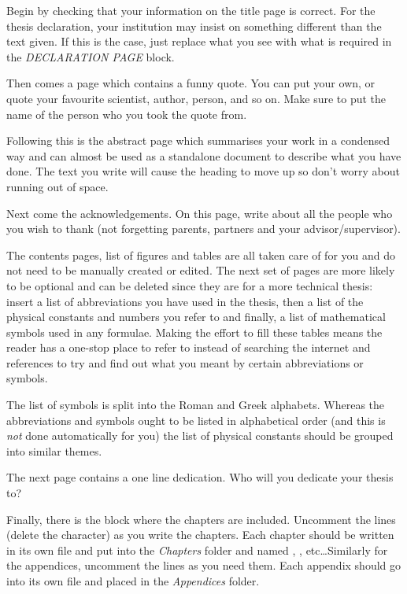 Begin by checking that your information on the title page is correct. For the thesis declaration, your institution may insist on something different than the text given. If this is the case, just replace what you see with what is required in the \emph{DECLARATION PAGE} block.

Then comes a page which contains a funny quote. You can put your own, or quote your favourite scientist, author, person, and so on. Make sure to put the name of the person who you took the quote from.

Following this is the abstract page which summarises your work in a condensed way and can almost be used as a standalone document to describe what you have done. The text you write will cause the heading to move up so don't worry about running out of space.

Next come the acknowledgements. On this page, write about all the people who you wish to thank (not forgetting parents, partners and your advisor/supervisor).

The contents pages, list of figures and tables are all taken care of for you and do not need to be manually created or edited. The next set of pages are more likely to be optional and can be deleted since they are for a more technical thesis: insert a list of abbreviations you have used in the thesis, then a list of the physical constants and numbers you refer to and finally, a list of mathematical symbols used in any formulae. Making the effort to fill these tables means the reader has a one-stop place to refer to instead of searching the internet and references to try and find out what you meant by certain abbreviations or symbols.

The list of symbols is split into the Roman and Greek alphabets. Whereas the abbreviations and symbols ought to be listed in alphabetical order (and this is \emph{not} done automatically for you) the list of physical constants should be grouped into similar themes.

The next page contains a one line dedication. Who will you dedicate your thesis to?

Finally, there is the block where the chapters are included. Uncomment the lines (delete the \code{\%} character) as you write the chapters. Each chapter should be written in its own file and put into the \emph{Chapters} folder and named , , etc\ldots Similarly for the appendices, uncomment the lines as you need them. Each appendix should go into its own file and placed in the \emph{Appendices} folder.

